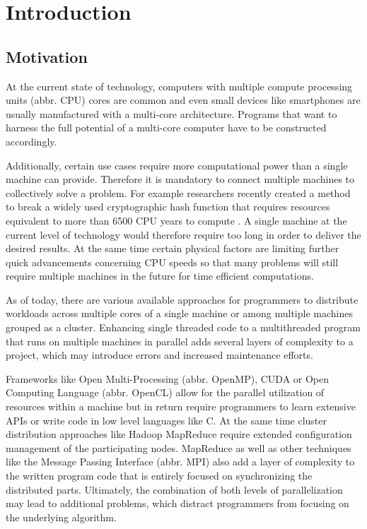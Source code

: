 \chapter{Introduction}

\section{Motivation}

At the current state of technology, computers with multiple compute processing units (abbr. CPU) cores are common and even small devices like smartphones are usually manufactured with a multi-core architecture. Programs that want to harness the full potential of a multi-core computer have to be constructed accordingly.

Additionally, certain use cases require more computational power than a single machine can provide. Therefore it is mandatory to connect multiple machines to collectively solve a problem. For example researchers recently created a method to break a widely used cryptographic hash function that requires resources equivalent to more than 6500 CPU years to compute \cite{shattered}. A single machine at the current level of technology would therefore require too long in order to deliver the desired results. At the same time certain physical factors are limiting further quick advancements concerning CPU speeds \cite{end_of_moores_law}\cite{end_of_silicon} so that many problems will still require multiple machines in the future for time efficient computations.

As of today, there are various available approaches for programmers to distribute workloads across multiple cores of a single machine or among multiple machines grouped as a cluster. Enhancing single threaded code to a multithreaded program that runs on multiple machines in parallel adds several layers of complexity to a project, which may introduce errors and increased maintenance efforts.

Frameworks like Open Multi-Processing (abbr. OpenMP), CUDA or Open Computing Language (abbr. OpenCL) allow for the parallel utilization of resources within a machine but in return require programmers to learn extensive APIs or write code in low level languages like C.
At the same time cluster distribution approaches like Hadoop MapReduce require extended configuration management of the participating nodes. MapReduce as well as other techniques like the Message Passing Interface (abbr. MPI) also add a layer of complexity to the written program code that is entirely focused on synchronizing the distributed parts.
Ultimately, the combination of both levels of parallelization may lead to additional problems, which distract programmers from focusing on the underlying algorithm.

